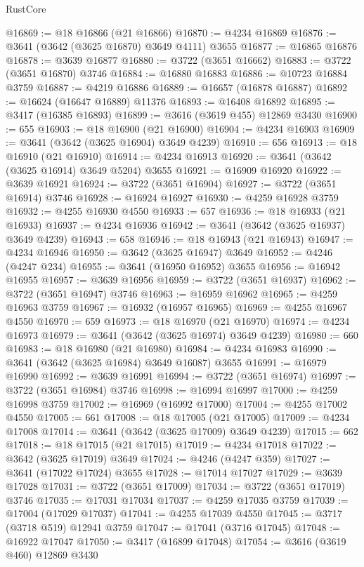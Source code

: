 \begin{lexlean}{RustCore}
\begin{coremodule}
@16869 := @18 @16866 (@21 @16866)
@16870 := @4234 @16869
@16876 := @3641 (@3642 (@3625 @16870) @3649 @4111) @3655
@16877 := @16865 @16876
@16878 := @3639 @16877
@16880 := @3722 (@3651 @16662)
@16883 := @3722 (@3651 @16870) @3746
@16884 := @16880 @16883
@16886 := @10723 @16884 @3759
@16887 := @4219 @16886
@16889 := @16657 (@16878 @16887)
@16892 := @16624 (@16647 @16889) @11376
@16893 := @16408 @16892
@16895 := @3417 (@16385 @16893)
@16899 := @3616 (@3619 @455) @12869 @3430
@16900 := 655
@16903 := @18 @16900 (@21 @16900)
@16904 := @4234 @16903
@16909 := @3641 (@3642 (@3625 @16904) @3649 @4239)
@16910 := 656
@16913 := @18 @16910 (@21 @16910)
@16914 := @4234 @16913
@16920 := @3641 (@3642 (@3625 @16914) @3649 @5204) @3655
@16921 := @16909 @16920
@16922 := @3639 @16921
@16924 := @3722 (@3651 @16904)
@16927 := @3722 (@3651 @16914) @3746
@16928 := @16924 @16927
@16930 := @4259 @16928 @3759
@16932 := @4255 @16930 @4550
@16933 := 657
@16936 := @18 @16933 (@21 @16933)
@16937 := @4234 @16936
@16942 := @3641 (@3642 (@3625 @16937) @3649 @4239)
@16943 := 658
@16946 := @18 @16943 (@21 @16943)
@16947 := @4234 @16946
@16950 := @3642 (@3625 @16947) @3649
@16952 := @4246 (@4247 @234)
@16955 := @3641 (@16950 @16952) @3655
@16956 := @16942 @16955
@16957 := @3639 @16956
@16959 := @3722 (@3651 @16937)
@16962 := @3722 (@3651 @16947) @3746
@16963 := @16959 @16962
@16965 := @4259 @16963 @3759
@16967 := @16932 (@16957 @16965)
@16969 := @4255 @16967 @4550
@16970 := 659
@16973 := @18 @16970 (@21 @16970)
@16974 := @4234 @16973
@16979 := @3641 (@3642 (@3625 @16974) @3649 @4239)
@16980 := 660
@16983 := @18 @16980 (@21 @16980)
@16984 := @4234 @16983
@16990 := @3641 (@3642 (@3625 @16984) @3649 @16087) @3655
@16991 := @16979 @16990
@16992 := @3639 @16991
@16994 := @3722 (@3651 @16974)
@16997 := @3722 (@3651 @16984) @3746
@16998 := @16994 @16997
@17000 := @4259 @16998 @3759
@17002 := @16969 (@16992 @17000)
@17004 := @4255 @17002 @4550
@17005 := 661
@17008 := @18 @17005 (@21 @17005)
@17009 := @4234 @17008
@17014 := @3641 (@3642 (@3625 @17009) @3649 @4239)
@17015 := 662
@17018 := @18 @17015 (@21 @17015)
@17019 := @4234 @17018
@17022 := @3642 (@3625 @17019) @3649
@17024 := @4246 (@4247 @359)
@17027 := @3641 (@17022 @17024) @3655
@17028 := @17014 @17027
@17029 := @3639 @17028
@17031 := @3722 (@3651 @17009)
@17034 := @3722 (@3651 @17019) @3746
@17035 := @17031 @17034
@17037 := @4259 @17035 @3759
@17039 := @17004 (@17029 @17037)
@17041 := @4255 @17039 @4550
@17045 := @3717 (@3718 @519) @12941 @3759
@17047 := @17041 (@3716 @17045)
@17048 := @16922 @17047
@17050 := @3417 (@16899 @17048)
@17054 := @3616 (@3619 @460) @12869 @3430

\end{coremodule}
\end{lexlean}
